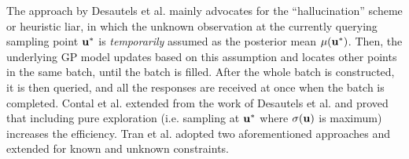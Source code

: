 The approach by Desautels et al. \cite{desautels2014parallelizing} mainly advocates for the ``hallucination'' scheme or heuristic liar, in which the unknown observation at the currently querying sampling point ${\bf u}^*$ is \emph{temporarily} assumed as the posterior mean $\mu({\bf u}^*)$. 
Then, the underlying GP model updates based on this assumption and locates other points in the same batch, until the batch is filled. 
After the whole batch is constructed, it is then queried, and all the responses are received at once when the batch is completed. 
Contal et al. \cite{contal2013parallel} extended from the work of Desautels et al. \cite{desautels2014parallelizing} and proved that including pure exploration (i.e. sampling at ${\bf u}^*$ where $\sigma({\bf u})$ is maximum) increases the efficiency. Tran et al. \cite{tran2019pbo} adopted two aforementioned approaches and extended for known and unknown constraints. 


